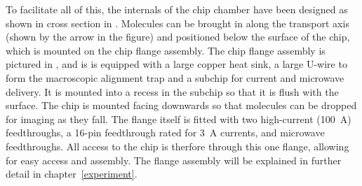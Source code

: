 
To facilitate all of this, the internals of the chip chamber have been designed
as shown in cross section in .
Molecules can be brought in along the transport axis (shown by the arrow in the
figure) and positioned below the surface of the chip, which is mounted on the
chip flange assembly. The chip flange assembly is pictured in
, and is is equipped with a large
copper heat sink, a large U-wire to form the macroscopic alignment trap and a
subchip for current and microwave delivery. It is mounted
into a recess in the subchip so that it is flush with the surface. The chip is
mounted facing downwards so that molecules can be dropped for imaging as they
fall. The flange itself is fitted with two high-current (\SI{100}{\ampere})
feedthroughs, a 16-pin feedthrough rated for \SI{3}{\ampere} currents, and
microwave feedthroughs. All access to the chip is therfore through this one
flange, allowing for easy access and assembly. The flange assembly will be
explained in further detail in chapter~\ref{experiment}.
